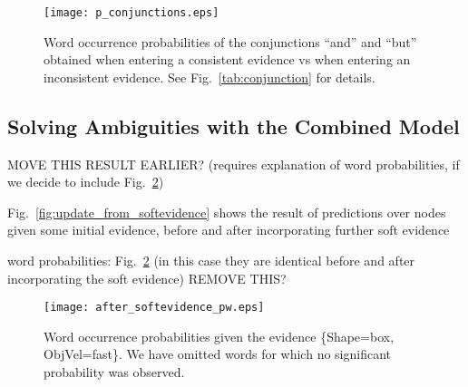 

\begin{figure}
\centering
\texttt{[image: p\_conjunctions.eps]}
\caption{Word occurrence probabilities of the conjunctions ``and'' and ``but'' obtained when entering a consistent \actioneffect{} evidence vs when entering an inconsistent \actioneffect{} evidence. See Fig.~\ref{tab:conjunction} for details.}
\label{fig:p_conjunctions}
\end{figure}

\subsection{Solving Ambiguities with the Combined Model}

MOVE THIS RESULT EARLIER? (requires explanation of word probabilities, if we decide to include Fig.~\ref{fig:after_softevidence:pw})


Fig.~\ref{fig:update_from_softevidence} shows the result of predictions over nodes given some initial evidence, before and after incorporating further soft evidence

\begin{figure*}
    \centering
     \quad
    \caption{Predictions about the action and hand velocity on a box object, before and after incorporating Action soft evidence from Gesture \acp{HMM}.}
    \label{fig:update_from_softevidence}
\end{figure*}

word probabilities: Fig.~\ref{fig:after_softevidence:pw} (in this case they are identical before and after incorporating the soft evidence) REMOVE THIS?

\begin{figure}
\centering
\texttt{[image: after\_softevidence\_pw.eps]}
\caption{Word occurrence probabilities given the evidence \{Shape=box, ObjVel=fast\}. We have omitted words for which no significant probability was observed.}
\label{fig:after_softevidence:pw}
\end{figure}
